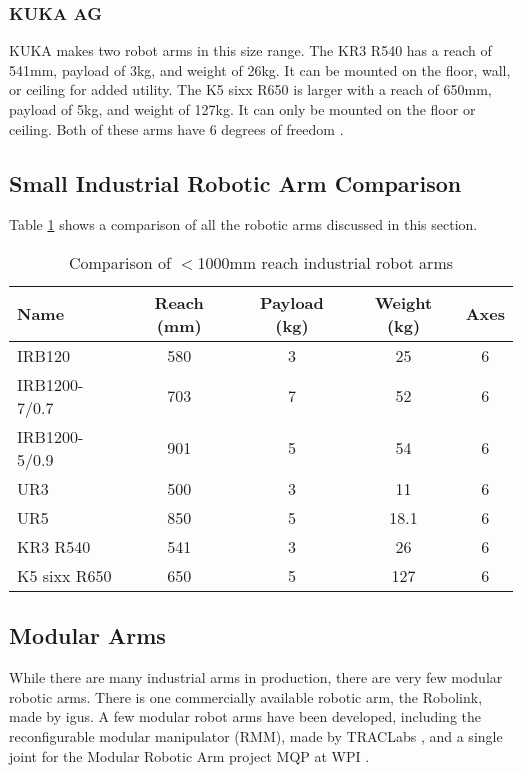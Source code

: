 \subsubsection{KUKA AG}
KUKA makes two robot arms in this size range. The KR3 R540 has a reach of 541mm, payload of 3kg, and weight of 26kg. It can be mounted on the floor, wall, or ceiling for added utility. The K5 sixx R650 is larger with a reach of 650mm, payload of 5kg, and weight of 127kg. It can only be mounted on the floor or ceiling. Both of these arms have 6 degrees of freedom \cite{RobotWorx}.

\subsection{Small Industrial Robotic Arm Comparison}
Table \ref{tab:ArmComparison} shows a comparison of all the robotic arms discussed in this section.
\begin{table} [H]
\centering
\begin{tabular}{| l | c | c | c | c |}
\hline
\textbf{Name} & \textbf{Reach (mm)} & \textbf{Payload (kg)} & \textbf{Weight (kg)} & \textbf{Axes} \\
\hline
IRB120 & 580 & 3 & 25 & 6 \\
IRB1200-7/0.7 & 703 & 7 & 52 & 6 \\
IRB1200-5/0.9 & 901 & 5 & 54 & 6 \\
UR3 & 500 & 3 & 11 & 6 \\
UR5 & 850 & 5 & 18.1 & 6 \\
KR3 R540 & 541 & 3 & 26 & 6 \\
K5 sixx R650 & 650 & 5 & 127 & 6 \\
\hline
\end{tabular}
\caption{Comparison of $<$1000mm reach industrial robot arms}
\label{tab:ArmComparison}
\end{table}

\subsection{Modular Arms}
While there are many industrial arms in production, there are very few modular robotic arms. There is one commercially available robotic arm, the Robolink, made by igus. A few modular robot arms have been developed, including the reconfigurable modular manipulator (RMM), made by TRACLabs \cite{RMM}, and a single joint for the Modular Robotic Arm project MQP at WPI \cite{MRA}.

